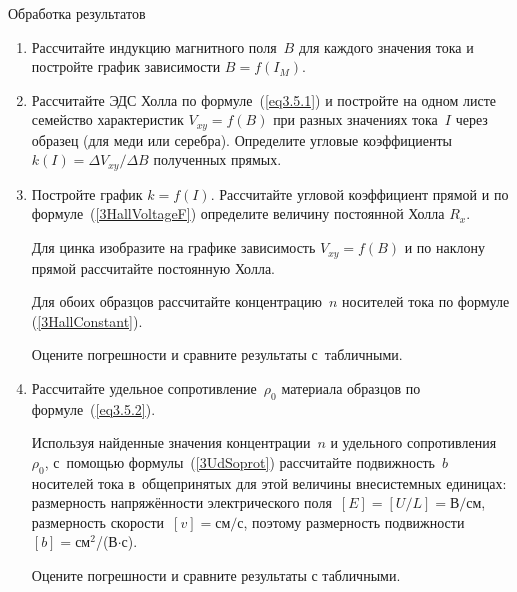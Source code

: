 {\rm Обработка результатов}
\begin{enumerate}
\item{Рассчитайте индукцию магнитного поля~$B$ для каждого значения тока и постройте график зависимости $B=f(I_{M})$.}

\item{Рассчитайте ЭДС Холла по формуле~(\ref{eq3.5.1}) и постройте на одном листе семейство характеристик $V_{xy}=f(B)$ при разных значениях тока~$I$ через образец (для меди или серебра). Определите угловые коэффициенты~$k(I)=\Delta V_{xy}/\Delta B$ полученных прямых.}

\item{ Постройте график $k=f(I)$. Рассчитайте угловой коэффициент прямой и по формуле~(\ref{3HallVoltageF}) определите величину постоянной Холла $R_x$.

Для цинка изобразите на графике зависимость $V_{xy}=f(B)$ и по наклону прямой рассчитайте постоянную Холла.

Для обоих образцов рассчитайте концентрацию~$n$ носителей тока по формуле (\ref{3HallConstant}).

Оцените погрешности и сравните результаты с~табличными.}

\item{ Рассчитайте удельное сопротивление~$\rho_0$ материала образцов по формуле~(\ref{eq3.5.2}).

Используя найденные значения концентрации~$n$ и удельного сопротивления~$\rho_0$, с~помощью формулы~(\ref{3UdSoprot}) рассчитайте подвижность~$b$ носителей тока в~общепринятых для этой величины внесистемных единицах: размерность напряжённости электрического поля~$[E]=[U/L]=$В$/$см, размерность скорости~$[v]=$см$/$с, поэтому размерность подвижности $[b]=$см$^2$/(В$\cdot$с).

Оцените погрешности и сравните результаты с табличными.
}
\end{enumerate}

